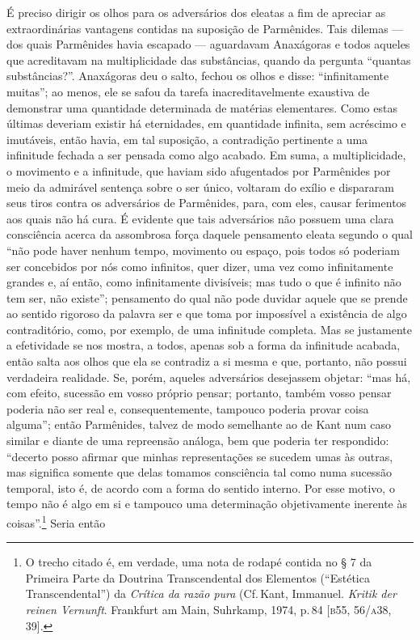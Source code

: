 É preciso dirigir os olhos para os adversários dos eleatas a fim de apreciar
as extraordinárias vantagens contidas na suposição de Parmênides. Tais
dilemas --- dos quais Parmênides havia escapado --- aguardavam Anaxágoras e
todos aqueles que acreditavam na multiplicidade das substâncias, quando da
pergunta ``quantas substâncias?''. Anaxágoras deu o salto, fechou os olhos e
disse: ``infinitamente muitas''; ao menos, ele se safou da tarefa
inacreditavelmente exaustiva de demonstrar uma quantidade determinada de
matérias elementares. Como estas últimas deveriam existir há eternidades, em
quantidade infinita, sem acréscimo e imutáveis, então havia, em tal
suposição, a contradição pertinente a uma infinitude fechada a ser pensada
como algo acabado. Em suma, a multiplicidade, o movimento e a infinitude, que
haviam sido afugentados por Parmênides por meio da admirável sentença sobre o
ser único, voltaram do exílio e dispararam seus tiros contra os adversários
de Parmênides, para, com eles, causar ferimentos aos quais não há cura. É
evidente que tais adversários não possuem uma clara consciência acerca da
assombrosa força daquele pensamento eleata segundo o qual ``não pode haver
nenhum tempo, movimento ou espaço, pois todos só poderiam ser concebidos por
nós como infinitos, quer dizer, uma vez como infinitamente grandes e, aí
então, como infinitamente divisíveis; mas tudo o que é infinito não tem ser,
não existe''; pensamento do qual não pode duvidar aquele que se prende ao
sentido rigoroso da palavra ser e que toma por impossível a existência de
algo contraditório, como, por exemplo, de uma infinitude completa. Mas se
justamente a efetividade se nos mostra, a todos, apenas sob a forma da
infinitude acabada, então salta aos olhos que ela se contradiz a si mesma e
que, portanto, não possui verdadeira realidade. Se, porém, aqueles
adversários desejassem objetar: ``mas há, com efeito, sucessão em vosso
próprio pensar; portanto, também vosso pensar poderia não ser real e,
consequentemente, tampouco poderia provar coisa alguma''; então Parmênides,
talvez de modo semelhante ao de Kant num caso similar e diante de uma
repreensão análoga, bem que poderia ter respondido: ``decerto posso afirmar
que minhas representações se sucedem umas às outras, mas significa somente
que delas tomamos consciência tal como numa sucessão temporal, isto é, de
acordo com a forma do sentido interno. Por esse motivo, o tempo não é algo em
si e tampouco uma determinação objetivamente inerente às coisas''.\footnote
{ O trecho citado é, em verdade, uma nota de rodapé contida no § 7 da
Primeira Parte da Doutrina Transcendental dos Elementos
(``Estética Transcendental'') da \textit{Crítica da razão pura}
(Cf.\,Kant, Immanuel. \textit{Kritik der reinen Vernunft}. Frankfurt am Main,
Suhrkamp, 1974, p.\,84 [\textsc{b}55, 56/\textsc{a}38, 39].} Seria então
